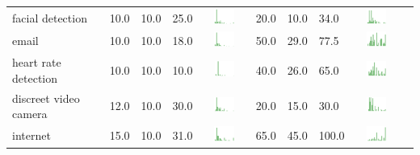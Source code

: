\begin{table}[t]
\begin{center}
\begin{tabular}{| p{2cm} | p{1cm} | p{1cm} | p{1cm} | c | p{2cm} | p{1cm} | p{1cm} | p{1cm} | c |}
facial detection & 10.0 & 10.0 & 25.0 & \includegraphics[width = 2cm, height = 0.5cm]{tex-inputs/appendix/riskbenefit-images/facialdetectionrisk} & 20.0 & 10.0 & 34.0 & \includegraphics[width = 2cm, height = 0.5cm]{tex-inputs/appendix/riskbenefit-images/facialdetectionben} \\ 
email & 10.0 & 10.0 & 18.0 & \includegraphics[width = 2cm, height = 0.5cm]{tex-inputs/appendix/riskbenefit-images/emailrisk} & 50.0 & 29.0 & 77.5 & \includegraphics[width = 2cm, height = 0.5cm]{tex-inputs/appendix/riskbenefit-images/emailben} \\ 
heart rate detection & 10.0 & 10.0 & 10.0 & \includegraphics[width = 2cm, height = 0.5cm]{tex-inputs/appendix/riskbenefit-images/heartratedetectionrisk} & 40.0 & 26.0 & 65.0 & \includegraphics[width = 2cm, height = 0.5cm]{tex-inputs/appendix/riskbenefit-images/heartratedetectionben} \\ 
discreet video camera & 12.0 & 10.0 & 30.0 & \includegraphics[width = 2cm, height = 0.5cm]{tex-inputs/appendix/riskbenefit-images/discreetvideocamerarisk} & 20.0 & 15.0 & 30.0 & \includegraphics[width = 2cm, height = 0.5cm]{tex-inputs/appendix/riskbenefit-images/discreetvideocameraben} \\ 
internet & 15.0 & 10.0 & 31.0 & \includegraphics[width = 2cm, height = 0.5cm]{tex-inputs/appendix/riskbenefit-images/internetrisk} & 65.0 & 45.0 & 100.0 & \includegraphics[width = 2cm, height = 0.5cm]{tex-inputs/appendix/riskbenefit-images/internetben} \\ 

\end{tabular}
\end{center}
\end{table}
